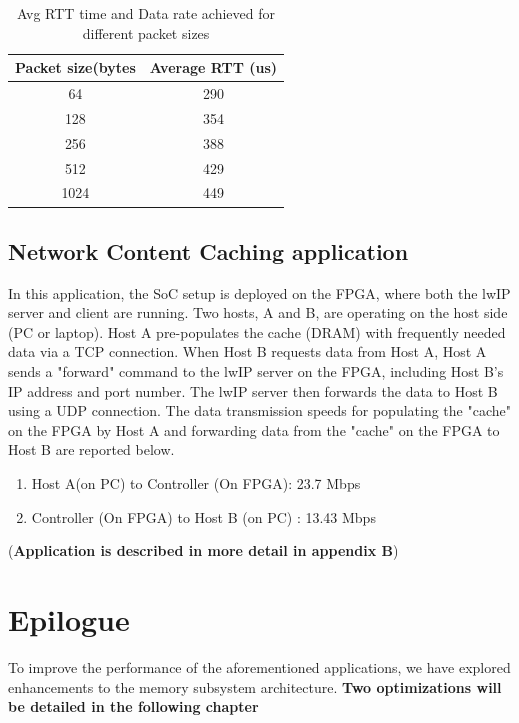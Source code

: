 \documentclass[12pt]{report}
\begin{document}
\begin{table}[h!]
\caption{Avg RTT time and Data rate achieved for different  packet sizes}
\begin{center}
\begin{tabular}{|c|c|}

\hline
\textbf{Packet size(bytes} & \textbf{Average RTT (us)}  \\
\hline
64 & 290    \\
\hline
128 & 354   \\
\hline
256 & 388   \\
\hline
512 & 429   \\
\hline
1024 & 449   \\
\hline
\end{tabular}
\label{table_dataRate}
\end{center}
\end{table}



\newpage
\subsection{Network Content Caching application}

In this application, the SoC setup is deployed on the FPGA, where both the lwIP server and client are running. Two hosts, A and B, are operating on the host side (PC or laptop). Host A pre-populates the cache (DRAM) with frequently needed data via a TCP connection. When Host B requests data from Host A, Host A sends a "forward" command to the lwIP server on the FPGA, including Host B's IP address and port number. The lwIP server then forwards the data to Host B using a UDP connection. The data transmission speeds for populating the "cache" on the FPGA by Host A and forwarding data from the "cache" on the FPGA to Host B are reported below.
\begin{enumerate}
    \item Host A(on PC) to Controller (On FPGA): 23.7 Mbps
    \item Controller (On FPGA) to Host B (on PC) : 13.43 Mbps
\end{enumerate}
(\textbf{Application is described in more detail in appendix B})


\section{Epilogue}
To improve the performance of the aforementioned applications, we have explored enhancements to the memory subsystem architecture. \newline \textbf{Two optimizations will be detailed in the following chapter}
\newpage
\end{document}
